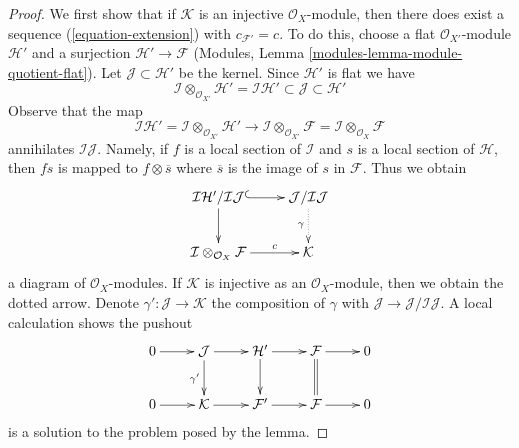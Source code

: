 \begin{proof}
We first show that if $\mathcal{K}$ is an injective $\mathcal{O}_X$-module,
then there does exist a sequence (\ref{equation-extension}) with
$c_{\mathcal{F}'} = c$. To do this, choose a flat
$\mathcal{O}_{X'}$-module $\mathcal{H}'$ and a surjection
$\mathcal{H}' \to \mathcal{F}$
(Modules, Lemma \ref{modules-lemma-module-quotient-flat}).
Let $\mathcal{J} \subset \mathcal{H}'$ be the kernel. Since $\mathcal{H}'$
is flat we have
$$
\mathcal{I} \otimes_{\mathcal{O}_{X'}} \mathcal{H}' =
\mathcal{I}\mathcal{H}'
\subset \mathcal{J} \subset \mathcal{H}'
$$
Observe that the map
$$
\mathcal{I}\mathcal{H}' =
\mathcal{I} \otimes_{\mathcal{O}_{X'}} \mathcal{H}'
\longrightarrow
\mathcal{I} \otimes_{\mathcal{O}_{X'}} \mathcal{F} =
\mathcal{I} \otimes_{\mathcal{O}_X} \mathcal{F}
$$
annihilates $\mathcal{I}\mathcal{J}$. Namely, if $f$ is a local section
of $\mathcal{I}$ and $s$ is a local section of $\mathcal{H}$, then
$fs$ is mapped to $f \otimes \overline{s}$ where $\overline{s}$ is
the image of $s$ in $\mathcal{F}$. Thus we obtain
$$
\xymatrix{
\mathcal{I}\mathcal{H}'/\mathcal{I}\mathcal{J}
\ar@{^{(}->}[r] \ar[d] &
\mathcal{J}/\mathcal{I}\mathcal{J} \ar@{..>}[d]_\gamma \\
\mathcal{I} \otimes_{\mathcal{O}_X} \mathcal{F} \ar[r]^-c &
\mathcal{K}
}
$$
a diagram of $\mathcal{O}_X$-modules. If $\mathcal{K}$ is injective
as an $\mathcal{O}_X$-module, then we obtain the dotted arrow.
Denote $\gamma' : \mathcal{J} \to \mathcal{K}$ the composition
of $\gamma$ with $\mathcal{J} \to \mathcal{J}/\mathcal{I}\mathcal{J}$.
A local calculation shows the pushout
$$
\xymatrix{
0 \ar[r] &
\mathcal{J} \ar[r] \ar[d]_{\gamma'} &
\mathcal{H}' \ar[r] \ar[d] &
\mathcal{F} \ar[r] \ar@{=}[d] &
0 \\
0 \ar[r] &
\mathcal{K} \ar[r] &
\mathcal{F}' \ar[r] &
\mathcal{F} \ar[r] &
0
}
$$
is a solution to the problem posed by the lemma.


\end{proof}
